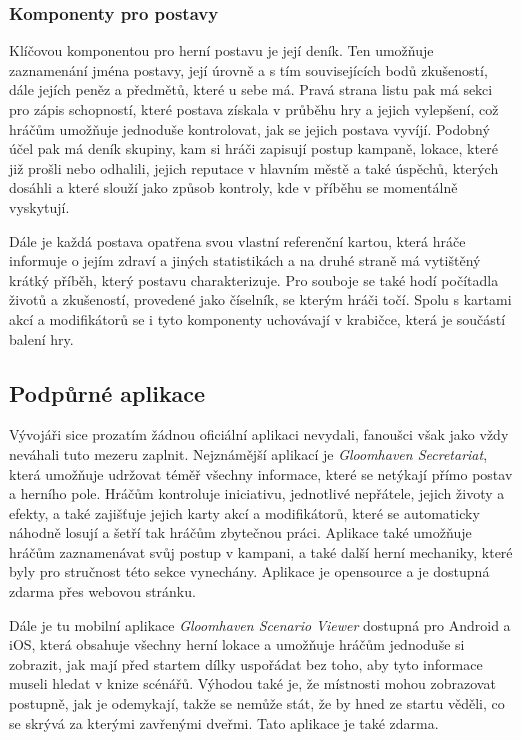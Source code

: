 \subsubsection*{Komponenty pro postavy}
\label{subsubsec:gh_comp_characters}

Klíčovou komponentou pro herní postavu je její deník. Ten umožňuje zaznamenání jména postavy, její úrovně a s tím souvisejících bodů zkušeností, dále jejích peněz a předmětů, které u sebe má. Pravá strana listu pak má sekci pro zápis schopností, které postava získala v průběhu hry a jejich vylepšení, což hráčům umožňuje jednoduše kontrolovat, jak se jejich postava vyvíjí. Podobný účel pak má deník skupiny, kam si hráči zapisují postup kampaně, lokace, které již prošli nebo odhalili, jejich reputace v hlavním městě a také úspěchů, kterých dosáhli a které slouží jako způsob kontroly, kde v příběhu se momentálně vyskytují.

Dále je každá postava opatřena svou vlastní referenční kartou, která hráče informuje o jejím zdraví a jiných statistikách a na druhé straně má vytištěný krátký příběh, který postavu charakterizuje. Pro souboje se také hodí počítadla životů a zkušeností, provedené jako číselník, se kterým hráči točí. Spolu s kartami akcí a modifikátorů se i tyto komponenty uchovávají v krabičce, která je součástí balení hry.

\subsection{Podpůrné aplikace}
\label{subsec:gh_apps}

Vývojáři sice prozatím žádnou oficiální aplikaci nevydali, fanoušci však jako vždy neváhali tuto mezeru zaplnit. Nejznámější aplikací je \textit{Gloomhaven Secretariat}, která umožňuje udržovat téměř všechny informace, které se netýkají přímo postav a herního pole. Hráčům kontroluje iniciativu, jednotlivé nepřátele, jejich životy a efekty, a také zajišťuje jejich karty akcí a modifikátorů, které se automaticky náhodně losují a šetří tak hráčům zbytečnou práci. Aplikace také umožňuje hráčům zaznamenávat svůj postup v kampani, a také další herní mechaniky, které byly pro stručnost této sekce vynechány. Aplikace je opensource a je dostupná zdarma přes webovou stránku.

Dále je tu mobilní aplikace \textit{Gloomhaven Scenario Viewer} dostupná pro Android a iOS, která obsahuje všechny herní lokace a umožňuje hráčům jednoduše si zobrazit, jak mají před startem dílky uspořádat bez toho, aby tyto informace museli hledat v knize scénářů. Výhodou také je, že místnosti mohou zobrazovat postupně, jak je odemykají, takže se nemůže stát, že by hned ze startu věděli, co se skrývá za kterými zavřenými dveřmi. Tato aplikace je také zdarma.

